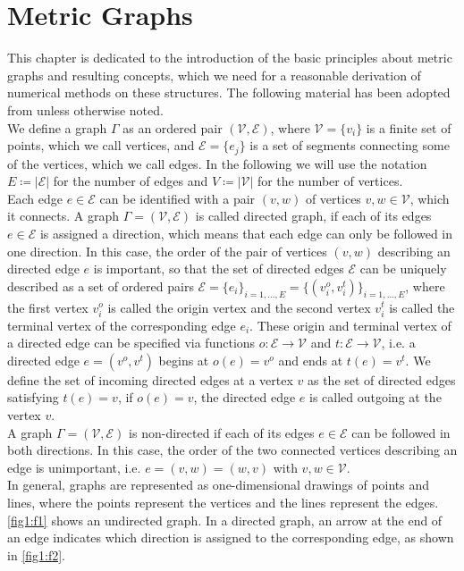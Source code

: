 \section{Metric Graphs}
\label{ch1:sec1}

This chapter is dedicated to the introduction of the basic principles about metric graphs and resulting concepts, which we need for a reasonable derivation of numerical methods on these structures. The following material has been adopted from \cite[chapter~1]{BerkolaikoKuchment:2013} unless otherwise noted. \\

We define a graph $\Gamma$ as an ordered pair $(\mathcal{V}, \mathcal{E})$, where $\mathcal{V} = \{v_i\}$ is a finite set of points, which we call vertices, and $\mathcal{E} = \{e_j\}$ is a set of segments connecting some of the vertices, which we call edges. In the following we will use the notation $E \coloneqq \left\lvert \mathcal{E} \right\rvert$ for the number of edges and $V \coloneqq \left\lvert \mathcal{V} \right\rvert$ for the number of vertices. \\
Each edge $e \in \mathcal{E}$ can be identified with a pair $(v, w)$ of vertices $v, w \in \mathcal{V}$, which it connects. A graph $\Gamma = (\mathcal{V}, \mathcal{E})$ is called directed graph, if each of its edges $e \in \mathcal{E}$ is assigned a direction, which means that each edge can only be followed in one direction. In this case, the order of the pair of vertices $(v, w)$ describing an directed edge $e$ is important, so that the set of directed edges $\mathcal{E}$ can be uniquely described as a set of ordered pairs $\mathcal{E} = \{e_i\}_{i = 1, \ldots, E} = \{(v^{o}_{i}, v^{t}_{i})\}_{i = 1, \ldots, E}$, where the first vertex $v^{o}_{i}$ is called the origin vertex and the second vertex $v^{t}_{i}$ is called the terminal vertex of the corresponding edge $e_i$. These origin and terminal vertex of a directed edge can be specified via functions $o \colon \mathcal{E} \to \mathcal{V}$ and $t \colon \mathcal{E} \to \mathcal{V}$, i.e. a directed edge $e = (v^{o}, v^{t})$ begins at $o(e) = v^{o}$ and ends at $t(e) = v^{t}$. We define the set of incoming directed edges at a vertex $v$ as the set of directed edges satisfying $t(e) = v$, if $o(e) = v$, the directed edge $e$ is called outgoing at the vertex $v$. \\
A graph $\Gamma = (\mathcal{V}, \mathcal{E})$ is non-directed if each of its edges $e \in \mathcal{E}$ can be followed in both directions. In this case, the order of the two connected vertices describing an edge is unimportant, i.e. $e = (v, w) = (w, v)$ with $v, w \in \mathcal{V}$. \\
In general, graphs are represented as one-dimensional drawings of points and lines, where the points represent the vertices and the lines represent the edges. \cref{fig1:f1} shows an undirected graph. In a directed graph, an arrow at the end of an edge indicates which direction is assigned to the corresponding edge, as shown in \cref{fig1:f2}. 

